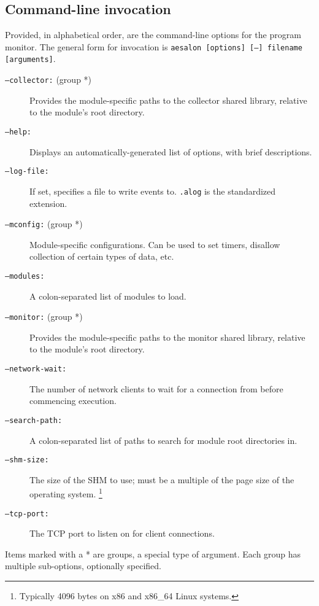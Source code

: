 \documentclass[a4paper,10pt]{report}
\begin{document}
\subsection{Command-line invocation}
Provided, in alphabetical order, are the command-line options for the program monitor. The general form
for invocation is \texttt{aesalon [options] [--] filename [arguments]}.
\begin{description}
 \item[\texttt{--collector:} (group *)] Provides the module-specific paths to the collector shared library, relative to the module's
  root directory.
 \item[\texttt{--help:}] Displays an automatically-generated list of options, with brief descriptions.
 \item[\texttt{--log-file:}] If set, specifies a file to write events to. \texttt{.alog} is the standardized extension.
 \item[\texttt{--mconfig:} (group *)] Module-specific configurations. Can be used to set timers, disallow collection of certain types of data, etc.
 \item[\texttt{--modules:}] A colon-separated list of modules to load.
 \item[\texttt{--monitor:} (group *)] Provides the module-specific paths to the monitor shared library, relative to the module's
  root directory.
 \item[\texttt{--network-wait:}] The number of network clients to wait for a connection from before commencing execution.
 \item[\texttt{--search-path:}] A colon-separated list of paths to search for module root directories in.
 \item[\texttt{--shm-size:}] The size of the SHM to use; must be a multiple of the page size of the operating system.%
  \footnote{Typically 4096 bytes on x86 and x86\_64 Linux systems.}
 \item[\texttt{--tcp-port:}] The TCP port to listen on for client connections.
\end{description}
\small{Items marked with a * are groups, a special type of argument. Each group has multiple sub-options, optionally specified.}
\end{document}

